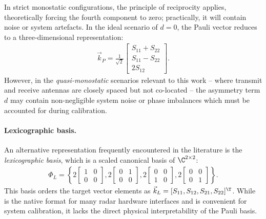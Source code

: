 In strict monostatic configurations, the principle of reciprocity applies, theoretically forcing the fourth component to zero; practically, it will contain noise or system artefacts.
In the ideal scenario of $d=0$, the Pauli vector reduces to a three-dimensional representation:
\begin{align}
    \label{eq:pauli-vector-3d}
    \vec k_P = \frac{1}{\sqrt{2}} \begin{bmatrix}
        S_{11} + S_{22} \\
        S_{11} - S_{22} \\
        2S_{12}
    \end{bmatrix}.
\end{align}
However, in the \emph{quasi-monostatic} scenarios relevant to this work -- where transmit and receive antennas are closely spaced but not co-located -- the asymmetry term $d$ may contain non-negligible system noise or phase imbalances which must be accounted for during calibration.

\paragraph{Lexicographic basis.}
An alternative representation frequently encountered in the literature is the \emph{lexicographic basis}, which is a scaled canonical basis of $\C^{2 \times 2}$:
\begin{align}
    \label{eq:lexicographic-basis}
    \Phi_L = \left\{
        2\begin{bmatrix} 1 & 0 \\ 0 & 0 \end{bmatrix},
        2\begin{bmatrix} 0 & 1 \\ 0 & 0 \end{bmatrix},
        2\begin{bmatrix} 0 & 0 \\ 1 & 0 \end{bmatrix},
        2\begin{bmatrix} 0 & 0 \\ 0 & 1 \end{bmatrix}
    \right\}.
\end{align}
This basis orders the target vector elements as $\vec k_L = [S_{11}, S_{12}, S_{21}, S_{22}]^\T$.
While is the native format for many radar hardware interfaces and is convenient for system calibration, it lacks the direct physical interpretability of the Pauli basis.

